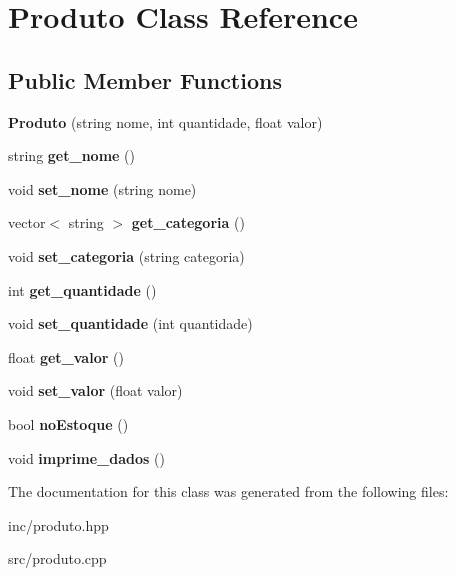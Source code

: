 \hypertarget{class_produto}{}\section{Produto Class Reference}
\label{class_produto}
\subsection*{Public Member Functions}
\begin{DoxyCompactItemize}
\item 
\mbox{\label{class_produto_ac61288fda27dc9801723378e2a8ea621}} 
{\bfseries Produto} (string nome, int quantidade, float valor)
\item 
\mbox{\label{class_produto_af3226ae7eafdec16f13f266464be7596}} 
string {\bfseries get\+\_\+nome} ()
\item 
\mbox{\label{class_produto_a55230e3937d26a09b2a143a2c2d5173d}} 
void {\bfseries set\+\_\+nome} (string nome)
\item 
\mbox{\label{class_produto_a3fd3e1e0fff93acd3231ec5efd457c7a}} 
vector$<$ string $>$ {\bfseries get\+\_\+categoria} ()
\item 
\mbox{\label{class_produto_a10b0890a8448b51ac46d8c2bc461d3d8}} 
void {\bfseries set\+\_\+categoria} (string categoria)
\item 
\mbox{\label{class_produto_a7be9c5aa12a4242a13cac4f624a75167}} 
int {\bfseries get\+\_\+quantidade} ()
\item 
\mbox{\label{class_produto_a7236d29a461f9d28f1dc402b98a8e4af}} 
void {\bfseries set\+\_\+quantidade} (int quantidade)
\item 
\mbox{\label{class_produto_ad0c2a7a11c09c62ff4988ffa4c220046}} 
float {\bfseries get\+\_\+valor} ()
\item 
\mbox{\label{class_produto_af01944f376da523a81130d2a6cbcc661}} 
void {\bfseries set\+\_\+valor} (float valor)
\item 
\mbox{\label{class_produto_a63068fa53c4ad736235e86f4aeaef6af}} 
bool {\bfseries no\+Estoque} ()
\item 
\mbox{\label{class_produto_a46a30f47ffa7f0e98bab6b13ad5e792c}} 
void {\bfseries imprime\+\_\+dados} ()
\end{DoxyCompactItemize}


The documentation for this class was generated from the following files\+:\begin{DoxyCompactItemize}
\item 
inc/produto.\+hpp\item 
src/produto.\+cpp\end{DoxyCompactItemize}
